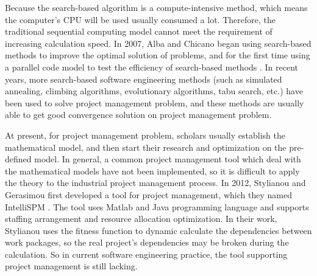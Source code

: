 Because the search-based algorithm is a compute-intensive method, which means 
the computer's CPU will be used usually consumed a lot. Therefore, the 
traditional sequential computing model cannot meet the requirement of 
increasing calculation speed. In 2007, Alba and Chicano began using search-based
 methods to improve the optimal solution of problems, and for 
the first time using a parallel code model to test the efficiency of search-based 
methods \cite{pospichal}. In recent years, more search-based software 
engineering methods (such as simulated annealing, climbing algorithms, 
evolutionary algorithms, tabu search, etc.) have been used to solve project 
management problem, and these methods are usually able to get good 
convergence solution on project management problem.


At present, for project management problem, scholars usually establish the
mathematical model, and then start their research and optimization on the
pre-defined model. In general, a common project management tool which deal with
the mathematical models have not been implemented, so it is difficult to apply
the theory to the industrial project management process. In 2012, Stylianou and
Gerasimou first developed a tool for project management, which they named
IntelliSPM \cite{stylianou}. The tool uses Matlab and Java programming language and 
supports staffing arrangement and resource allocation optimization. In
their work, Stylianou uses the fitness function to dynamic calculate the
dependencies between work packages, so the real project's dependencies may be
broken during the calculation. So in current software engineering practice, the
tool supporting project management is still lacking.

